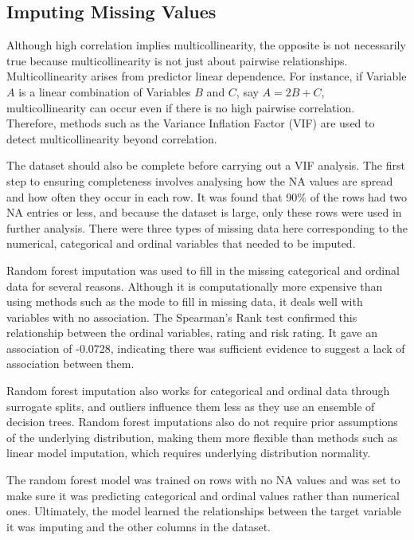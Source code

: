 \documentclass[11pt]{report} %
\begin{document}
\vspace{-0.3cm}
\subsection{Imputing Missing Values}
Although high correlation implies multicollinearity, the opposite is not necessarily true because multicollinearity is not just about pairwise relationships. Multicollinearity arises from predictor linear dependence. For instance, if Variable $A$ is a linear combination of Variables $B$ and $C$, say $A = 2B + C$, multicollinearity can occur even if there is no high pairwise correlation.\citep{kutner2005applied} 
Therefore, methods such as the Variance Inflation Factor (VIF) are used to detect multicollinearity beyond correlation.\citep{belsley1980regression} 


The dataset should also be complete before carrying out a VIF analysis. The first step to ensuring completeness involves analysing how the NA values are spread and how often they occur in each row. It was found that 90\% of the rows had two NA entries or less, and because the dataset is large, only these rows were used in further analysis. There were three types of missing data here corresponding to the numerical, categorical and ordinal variables that needed to be imputed.

Random forest imputation was used to fill in the missing categorical and ordinal data for several reasons. Although it is computationally more expensive than using methods such as the mode to fill in missing data, it deals well with variables with no association. The Spearman's Rank test confirmed this relationship between the ordinal variables, rating and risk rating. It gave an association of -0.0728, indicating there was sufficient evidence to suggest a lack of association between them.

Random forest imputation also works for categorical and ordinal data through surrogate splits, and outliers influence them less as they use an ensemble of decision trees. Random forest imputations also do not require prior assumptions of the underlying distribution, making them more flexible than methods such as linear model imputation, which requires underlying distribution normality.\cite{hong2020randomforest} 

The random forest model was trained on rows with no NA values and was set to make sure it was predicting categorical and ordinal values rather than numerical ones. Ultimately, the model learned the relationships between the target variable it was imputing and the other columns in the dataset. 
\end{document}
